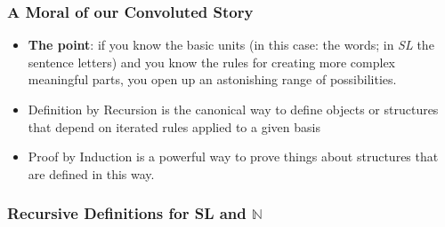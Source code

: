 
 \begin{frame}
\frametitle{A Moral of our Convoluted Story}

\begin{itemize}[<+->]
\item {\bf{The point}}: if you know the basic units (in this case: the words; in {\it{SL}} the sentence letters) and you know the rules for creating more complex meaningful parts, you open up an astonishing range of possibilities.


\item Definition by Recursion is the canonical way to define objects or structures that depend on iterated rules applied to a given basis

\item Proof by Induction is a powerful way to prove things about structures that are defined in this way. 

\end{itemize} 
\end{frame}

\subsubsection{Recursive Definitions for SL and $\mathbb{N}$}


